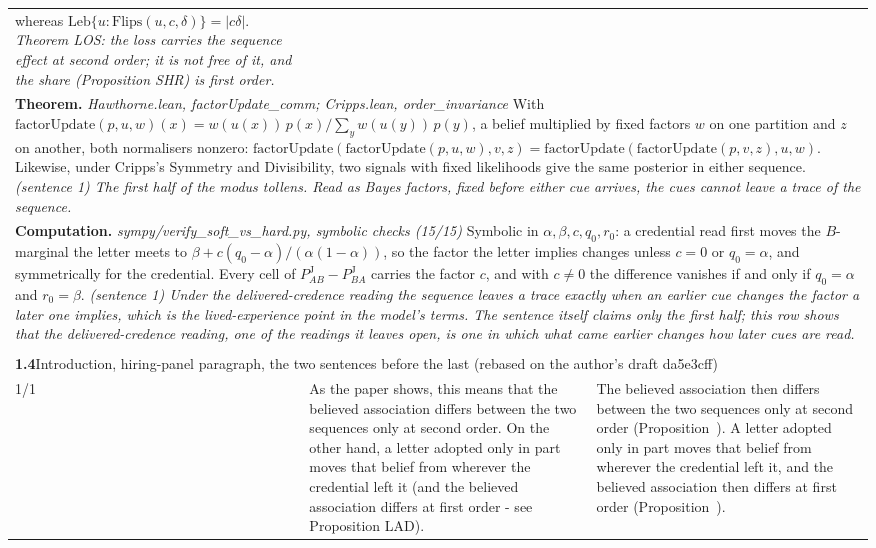 \documentclass[10pt]{article}
\theoremstyle{definition}
\newcommand{\PJ}{P^{\mathrm{J}}}
\renewcommand{\ref}[1]{\textsc{\detokenize{#1}}}
\newlength{\fullw}\setlength{\fullw}{25.9cm}
\newcommand{\entryhead}[2]{\multicolumn{3}{|l|}{\rule{0pt}{2.6ex}\large\textbf{#1}\quad #2} \\ \hline}
\begin{document}
{\begin{longtable}{|p{0.9cm}|p{12.2cm}|p{12.2cm}|}
{whereas $\mathrm{Leb}\{u:\mathrm{Flips}(u,c,\delta)\} = |c\delta|$. \newline \textit{Theorem LOS: the loss carries the sequence effect at second order;
it is not free of it, and the share (Proposition SHR) is first order.}} \\
\multicolumn{3}{|p{\fullw}|}{\textbf{Theorem.} \textit{Hawthorne.lean, factorUpdate\_comm; Cripps.lean, order\_invariance} \newline With $\mathrm{factorUpdate}(p,u,w)(x)=w(u(x))\,p(x)/\sum_y w(u(y))\,p(y)$, a
belief multiplied by fixed factors $w$ on one partition and $z$ on another, both
normalisers nonzero:
$\mathrm{factorUpdate}(\mathrm{factorUpdate}(p,u,w),v,z)
=\mathrm{factorUpdate}(\mathrm{factorUpdate}(p,v,z),u,w)$. Likewise, under Cripps's
Symmetry and Divisibility, two signals with fixed likelihoods give the same posterior
in either sequence. \newline \textit{(sentence 1) The first half of the modus tollens. Read as Bayes factors,
fixed before either cue arrives, the cues cannot leave a trace of the sequence.}} \\
\multicolumn{3}{|p{\fullw}|}{\textbf{Computation.} \textit{sympy/verify\_soft\_vs\_hard.py, symbolic checks (15/15)} \newline Symbolic in $\alpha,\beta,c,q_0,r_0$: a credential read first moves the
$B$-marginal the letter meets to $\beta+c(q_0-\alpha)/(\alpha(1-\alpha))$, so the
factor the letter implies changes unless $c=0$ or $q_0=\alpha$, and symmetrically for
the credential. Every cell of $\PJ_{AB}-\PJ_{BA}$ carries the factor $c$, and with
$c\neq0$ the difference vanishes if and only if $q_0=\alpha$ and $r_0=\beta$. \newline \textit{(sentence 1) Under the delivered-credence reading the sequence leaves a
trace exactly when an earlier cue changes the factor a later one implies, which is
the lived-experience point in the model's terms. The sentence itself claims only the
first half; this row shows that the delivered-credence reading, one of the readings it
leaves open, is one in which what came earlier changes how later cues are read.}} \\ \hline
\multicolumn{3}{|l|}{} \\ \hline
\entryhead{1.4}{Introduction, hiring-panel paragraph, the two sentences before the last (rebased on the author's draft da5e3cff)\quad{\footnotesize\textit{(formerly C.5)}}}
1/1 & As the paper shows, this means that the believed association differs between the two sequences only at second order. On the other hand, a letter adopted only in part moves that belief from wherever the credential left it (and the believed association differs at first order - see Proposition LAD). & The believed association then differs between the two sequences only at second order (Proposition~\ref{prop:ORD}). A letter adopted only in part moves that belief from wherever the credential left it, and the believed association then differs at first order (Proposition~\ref{prop:LAD}). \\ \hline

\end{longtable}}
\end{document}
